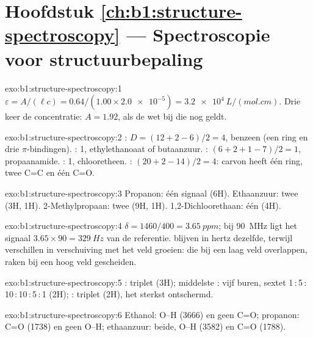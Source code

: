\section*{Hoofdstuk \ref{ch:b1:structure-spectroscopy} --- Spectroscopie voor structuurbepaling}

\begin{solution}{exo:b1:structure-spectroscopy:1}
$\varepsilon = A/(\ell c) = 0.64/(1.00 \times \num{2.0e-5}) =
\qty{3.2e4}{L/(mol.cm)}$. Drie keer de concentratie: $A = 1.92$, als de
wet bij die  nog geldt.
\end{solution}

\begin{solution}{exo:b1:structure-spectroscopy:2}
: $D = (12 + 2 - 6)/2 = 4$, benzeen (een ring en drie
$\pi$-bindingen). : 1, ethylethanoaat of butaanzuur.
: $(6 + 2 + 1
- 7)/2 = 1$, propaanamide. : 1, chlooretheen. :
$(20 + 2 - 14)/2 = 4$: carvon heeft één ring, twee C=C en één C=O.
\end{solution}

\begin{solution}{exo:b1:structure-spectroscopy:3}
Propanon: één signaal (6H). Ethaanzuur: twee (3H, 1H). 2-Methylpropaan:
twee (9H, 1H). 1,2-Dichloorethaan: één (4H).
\end{solution}

\begin{solution}{exo:b1:structure-spectroscopy:4}
$\delta = 1460/400 = \qty{3.65}{ppm}$; bij \qty{90}{MHz} ligt het signaal
$3.65 \times 90 = \qty{329}{Hz}$ van de referentie. 
blijven in hertz dezelfde, terwijl verschillen in verschuiving met het
veld groeien:  die bij een laag veld overlappen, raken bij
een hoog veld gescheiden.
\end{solution}

\begin{solution}{exo:b1:structure-spectroscopy:5}
: triplet (3H); middelste : vijf buren, sextet
1\,:\,5\,:\,10\,:\,10\,:\,5\,:\,1 (2H); : triplet (2H), het
sterkst ontschermd.
\end{solution}

\begin{solution}{exo:b1:structure-spectroscopy:6}
Ethanol: O--H (3666) en geen C=O; propanon: C=O (1738) en geen O--H;
ethaanzuur: beide, O--H (3582) en C=O (1788).
\end{solution}

